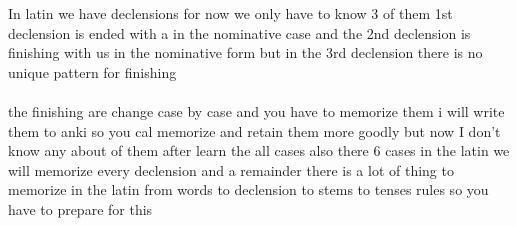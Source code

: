 In latin we have declensions for now we only have to know 3 of them 
1st declension is ended with a in the nominative case 
and the 2nd declension is finishing with us in the nominative form but 
in the 3rd declension there is no unique pattern for finishing
\\ \\
the finishing are change case by case and you have to memorize them i will
write them to anki so you cal memorize and retain them more goodly but now
I don't know any about of them after learn the all cases also there 6 cases in the 
latin we will memorize every declension and a remainder there is a lot of thing to 
memorize in the latin from words to declension to stems to tenses rules so you have to 
prepare for this
\\\\ 

